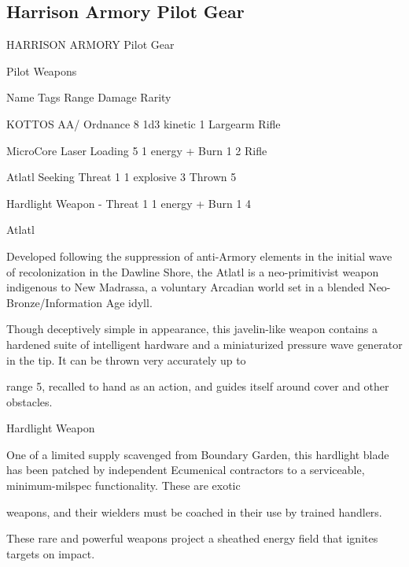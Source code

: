 \subsection{Harrison Armory Pilot Gear}

                                  HARRISON ARMORY Pilot Gear

                                                    Pilot Weapons

  Name                    Tags                                      Range            Damage                  Rarity

 KOTTOS AA/               Ordnance                                  8                1d3 kinetic             1
 Largearm Rifle

 MicroCore Laser          Loading                                  5                 1 energy + Burn 1       2
 Rifle

 Atlatl                   Seeking                                  Threat 1
         1 explosive             3
                                                                   Thrown 5

 Hardlight Weapon         -                                        Threat 1          1 energy + Burn 1       4

Atlatl

Developed following the suppression of anti-Armory elements in the initial wave of recolonization in the
Dawline Shore, the Atlatl is a neo-primitivist weapon indigenous to New Madrassa, a voluntary Arcadian
world set in a blended Neo-Bronze/Information Age idyll.

Though deceptively simple in appearance, this javelin-like weapon contains a hardened suite of intelligent
hardware and a miniaturized pressure wave generator in the tip. It can be thrown very accurately up to

range 5, recalled to hand as an action, and guides itself around cover and other obstacles.


Hardlight Weapon

One of a limited supply scavenged from Boundary Garden, this hardlight blade has been patched by
independent Ecumenical contractors to a serviceable, minimum-milspec functionality. These are exotic

weapons, and their wielders must be coached in their use by trained handlers.

These rare and powerful weapons project a sheathed energy field that ignites targets on impact.


